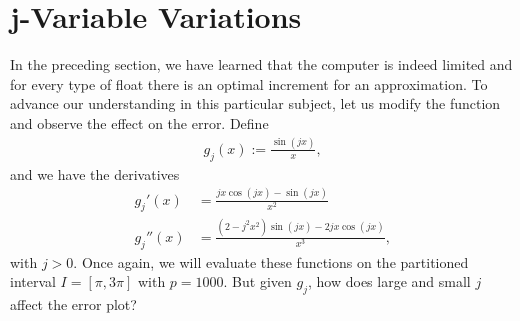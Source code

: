 \section{j-Variable Variations}

In the preceding section, we have learned that the computer is indeed limited and for every type of float there is an optimal increment for an approximation. To advance our understanding in this particular subject, let us modify the function and observe the effect on the error. Define
\begin{align*}
    g_j(x) := \frac{\sin(j x)}{x} \text{,}
\end{align*}
and we have the derivatives
\begin{align*}
    g_j'(x) &= \frac{j x \cos(jx) - \sin(jx)}{x^2} \\
    g_j''(x) &= \frac{(2 - j^2 x^2)\sin(jx) - 2 j x \cos(jx)}{x^3} \text{,}
\end{align*}
with \(j > 0\). Once again, we will evaluate these functions on the partitioned interval \(I = [\pi, 3\pi]\) with \(p = 1000\). But given \(g_j\), how does large and small \(j\) affect the error plot?

